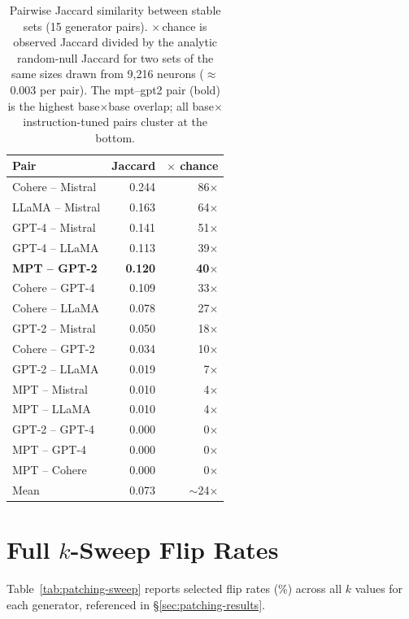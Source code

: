 \documentclass[11pt]{article}
\begin{document}
\begin{table}[!htbp]
\centering
\small
\begin{tabular}{lrr}
\toprule
Pair & Jaccard & $\times$ chance \\
\midrule
Cohere -- Mistral & 0.244 & 86$\times$ \\
LLaMA -- Mistral  & 0.163 & 64$\times$ \\
GPT-4 -- Mistral  & 0.141 & 51$\times$ \\
GPT-4 -- LLaMA    & 0.113 & 39$\times$ \\
\textbf{MPT -- GPT-2}      & \textbf{0.120} & \textbf{40$\times$} \\
Cohere -- GPT-4   & 0.109 & 33$\times$ \\
Cohere -- LLaMA   & 0.078 & 27$\times$ \\
GPT-2 -- Mistral  & 0.050 & 18$\times$ \\
Cohere -- GPT-2   & 0.034 & 10$\times$ \\
GPT-2 -- LLaMA    & 0.019 &  7$\times$ \\
MPT -- Mistral    & 0.010 &  4$\times$ \\
MPT -- LLaMA      & 0.010 &  4$\times$ \\
GPT-2 -- GPT-4    & 0.000 &  0$\times$ \\
MPT -- GPT-4      & 0.000 &  0$\times$ \\
MPT -- Cohere     & 0.000 &  0$\times$ \\
\midrule
Mean              & 0.073 & $\sim$24$\times$ \\
\bottomrule
\end{tabular}
\caption{Pairwise Jaccard similarity between stable sets (15 generator pairs). $\times$\,chance is observed Jaccard divided by the analytic random-null Jaccard for two sets of the same sizes drawn from 9,216 neurons ($\approx$0.003 per pair). The mpt--gpt2 pair (bold) is the highest base$\times$base overlap; all base$\times$instruction-tuned pairs cluster at the bottom.}
\label{tab:jaccard}
\end{table}

\section{Full $k$-Sweep Flip Rates}
\label{app:patching-sweep}

Table~\ref{tab:patching-sweep} reports selected flip rates (\%) across all $k$ values for each generator, referenced in §\ref{sec:patching-results}.
\end{document}
